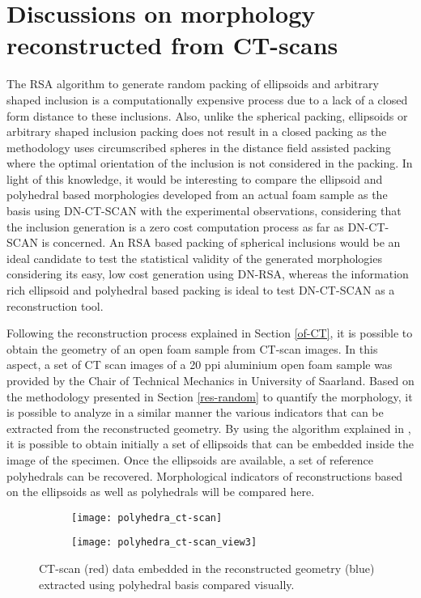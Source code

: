 \section{Discussions on morphology reconstructed from CT-scans}\label{res-ct}
The RSA algorithm to generate random packing of ellipsoids and arbitrary shaped inclusion is a computationally expensive process due to a lack of a closed form distance to these inclusions. Also, unlike the spherical packing, ellipsoids or arbitrary shaped inclusion packing does not result in a closed packing as the methodology uses circumscribed spheres in the distance field assisted packing where the optimal orientation of the inclusion is not considered in the packing. In light of this knowledge, it would be interesting to compare the ellipsoid and polyhedral based morphologies developed from an actual foam sample as the basis using DN-CT-SCAN with the experimental observations, considering that the inclusion generation is a zero cost computation process as far as DN-CT-SCAN is concerned. An RSA based packing of spherical inclusions would be an ideal candidate to test the statistical validity of the generated morphologies considering its easy, low cost generation using DN-RSA, whereas the information rich ellipsoid and polyhedral based packing is ideal to test DN-CT-SCAN as a reconstruction tool. 

Following the reconstruction process explained in Section \ref{of-CT}, it is possible to obtain the geometry of an open foam sample from CT-scan images. In this aspect, a set of CT scan images of a 20 ppi aluminium open foam sample was provided by the Chair of Technical Mechanics in University of Saarland. Based on the methodology presented in Section \ref{res-random} to quantify the morphology, it is possible to analyze in a similar manner the various indicators that can be extracted from the reconstructed geometry. By using the algorithm explained in \cite{leblancAnalysisOpenFoamUnderPreparation}, it is possible to obtain initially a set of ellipsoids that can be embedded inside the image of the specimen. Once the ellipsoids are available, a set of reference polyhedrals can be recovered. Morphological indicators of reconstructions based on the ellipsoids as well as polyhedrals will be compared here.

\begin{figure}
	\centering
	\begin{subfigure}[b]{0.45\textwidth}
		\texttt{[image: polyhedra\_ct-scan]}
	\end{subfigure}
	\begin{subfigure}[b]{0.45\textwidth}
		\texttt{[image: polyhedra\_ct-scan\_view3]}
	\end{subfigure}
	\caption{CT-scan (red) data embedded in the reconstructed geometry (blue) extracted using polyhedral basis compared visually.}\label{res-ct-visual}
\end{figure}

